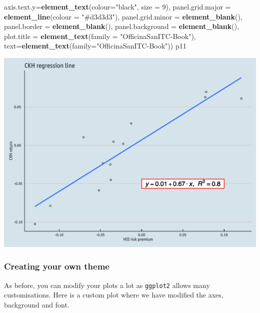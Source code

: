 \documentclass[]{article}
\newenvironment{Shaded}{\begin{snugshade}}{\end{snugshade}}
\newcommand{\KeywordTok}[1]{\textcolor[rgb]{0.13,0.29,0.53}{\textbf{{#1}}}}
\newcommand{\DataTypeTok}[1]{\textcolor[rgb]{0.13,0.29,0.53}{{#1}}}
\newcommand{\DecValTok}[1]{\textcolor[rgb]{0.00,0.00,0.81}{{#1}}}
\newcommand{\StringTok}[1]{\textcolor[rgb]{0.31,0.60,0.02}{{#1}}}
\newcommand{\NormalTok}[1]{{#1}}
\begin{document}
\begin{Shaded}
\begin{Highlighting}[]
            \DataTypeTok{axis.text.y=}\KeywordTok{element_text}\NormalTok{(}\DataTypeTok{colour=}\StringTok{"black"}\NormalTok{, }\DataTypeTok{size =} \DecValTok{9}\NormalTok{),}
            \DataTypeTok{panel.grid.major =} \KeywordTok{element_line}\NormalTok{(}\DataTypeTok{colour =} \StringTok{"#d3d3d3"}\NormalTok{), }
            \DataTypeTok{panel.grid.minor =} \KeywordTok{element_blank}\NormalTok{(), }
            \DataTypeTok{panel.border =} \KeywordTok{element_blank}\NormalTok{(), }\DataTypeTok{panel.background =} \KeywordTok{element_blank}\NormalTok{(),}
            \DataTypeTok{plot.title =} \KeywordTok{element_text}\NormalTok{(}\DataTypeTok{family =} \StringTok{"OfficinaSanITC-Book"}\NormalTok{),}
            \DataTypeTok{text=}\KeywordTok{element_text}\NormalTok{(}\DataTypeTok{family=}\StringTok{"OfficinaSanITC-Book"}\NormalTok{))}
\NormalTok{p11}
\end{Highlighting}
\end{Shaded}

\begin{center}\includegraphics{0_all_posts_pdf/lr_16-1} \end{center}

\subsubsection{Creating your own
theme}\label{creating-your-own-theme-10}

As before, you can modify your plots a lot as \texttt{ggplot2} allows
many customisations. Here is a custom plot where we have modified the
axes, background and font.
\end{document}
